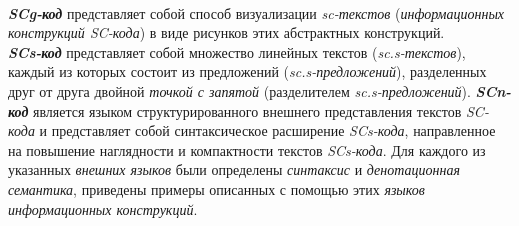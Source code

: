 \begin{SCn}
\begin{scnstruct}
{            \\\textbf{\textit{SCg-код}} представляет собой способ визуализации \textit{sc-текстов} (\textit{информационных конструкций SC-кода}) в виде рисунков этих абстрактных конструкций.
            \\\textbf{\textit{SCs-код}} представляет собой множество линейных текстов (\textit{sc.s-текстов}), каждый из которых состоит из предложений (\textit{sc.s-предложений}), разделенных друг от друга двойной \textit{точкой с запятой} (разделителем \textit{sc.s-предложений}).
            \textbf{\textit{SCn-код}} является языком структурированного внешнего представления текстов \textit{SC-кода} и представляет собой синтаксическое расширение \textit{SCs-кода}, направленное на повышение наглядности и компактности текстов \textit{SCs-кода}.
            Для каждого из указанных \textit{внешних языков} были определены \textit{синтаксис} и \textit{денотационная семантика}, приведены примеры описанных с помощью этих \textit{языков} \textit{информационных конструкций}.}


\end{scnstruct}
\end{SCn}
